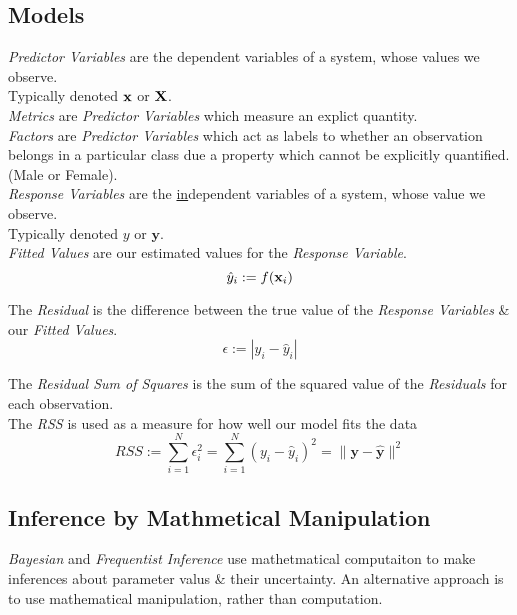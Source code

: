 \documentclass[11pt,a4paper]{article}
\begin{document}
\subsection{Models}

\textit{Predictor Variables} are the dependent variables of a system, whose values we observe.\\
\nb Typically denoted $\textbf{x}$ or $\textbf{X}$.\\

\textit{Metrics} are \textit{Predictor Variables} which measure an explict quantity.\\

\textit{Factors} are \textit{Predictor Variables} which act as labels to whether an observation belongs in a particular class due a property which cannot be explicitly quantified. (\eg Male or Female).\\

\textit{Response Variables} are the \underline{in}dependent variables of a system, whose value we observe.\\
\nb Typically denoted $y$ or $\textbf{y}$.\\

\textit{Fitted Values} are our estimated values for the \textit{Response Variable}.
$$\hat{y}_i:=f(\textbf{x}_i)$$

The \textit{Residual} is the difference between the true value of the \textit{Response Variables} \& our \textit{Fitted Values}.
$$\epsilon:=|y_i-\hat{y}_i|$$

The \textit{Residual Sum of Squares} is the sum of the squared value of the \textit{Residuals} for each observation.\\
The \textit{RSS} is used as a measure for how well our model fits the data
$$RSS:=\sum_{i=1}^N\epsilon_i^2=\sum_{i=1}^N(y_i-\hat{y}_i)^2=\|\textbf{y}-\hat{\textbf{y}}\|^2$$

\subsection{Inference by Mathmetical Manipulation}


\textit{Bayesian} and \textit{Frequentist Inference} use mathetmatical computaiton to make inferences about parameter valus \& their uncertainty. An alternative approach is to use mathematical manipulation, rather than computation.\\
\end{document}

